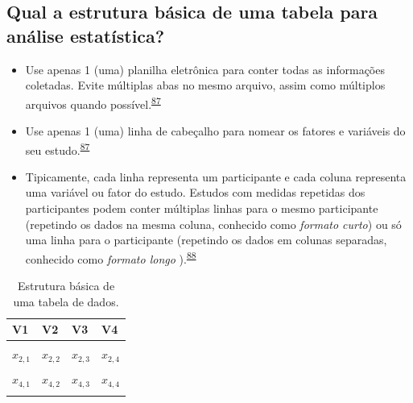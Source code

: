 \documentclass[
  a4paper,
]{book}
\begin{document}
\hypertarget{qual-a-estrutura-buxe1sica-de-uma-tabela-para-anuxe1lise-estatuxedstica}{%
\subsection{Qual a estrutura básica de uma tabela para análise estatística?}\label{qual-a-estrutura-buxe1sica-de-uma-tabela-para-anuxe1lise-estatuxedstica}}

\begin{itemize}
\item
  Use apenas 1 (uma) planilha eletrônica para conter todas as informações coletadas. Evite múltiplas abas no mesmo arquivo, assim como múltiplos arquivos quando possível.\textsuperscript{\protect\hyperlink{ref-broman2018}{87}}
\item
  Use apenas 1 (uma) linha de cabeçalho para nomear os fatores e variáveis do seu estudo.\textsuperscript{\protect\hyperlink{ref-broman2018}{87}}
\item
  Tipicamente, cada linha representa um participante e cada coluna representa uma variável ou fator do estudo. Estudos com medidas repetidas dos participantes podem conter múltiplas linhas para o mesmo participante (repetindo os dados na mesma coluna, conhecido como \emph{formato curto}) ou só uma linha para o participante (repetindo os dados em colunas separadas, conhecido como \emph{formato longo} ).\textsuperscript{\protect\hyperlink{ref-Juluru2015}{88}}
\end{itemize}

\begin{table}

\caption{\label{tab:tabela-0}Estrutura básica de uma tabela de dados.}
\centering
\begin{tabu} to 
\toprule
\textbf{V1} & \textbf{V2} & \textbf{V3} & \textbf{V4}\\
\midrule
{} &  &  & \\
$x_{2,1}$ & $x_{2,2}$ & $x_{2,3}$ & $x_{2,4}$\\
 &  &  & \\
$x_{4,1}$ & $x_{4,2}$ & $x_{4,3}$ & $x_{4,4}$\\
 &  &  & \\
\bottomrule
\end{tabu}
\end{table}
\end{document}
